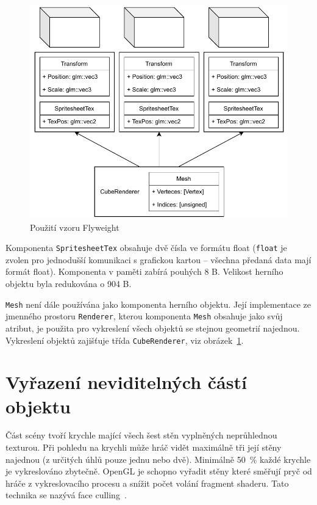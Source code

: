 \documentclass[thesis=M,czech]{FITthesis}[2019/12/23]
\begin{document}
\begin{figure}\centering
	\includegraphics[width=\textwidth]{images/go_components_fw_2}
	\caption[Použití vzoru Flyweight]{Použití vzoru Flyweight}\label{fig:go_components_fw}
\end{figure}

Komponenta \texttt{SpritesheetTex} obsahuje dvě čísla ve formátu float (\texttt{float} je zvolen pro jednodušší komunikaci s grafickou kartou -- všechna předaná data mají formát float). Komponenta v paměti zabírá pouhých 8 B. Velikost herního objektu byla redukována o 904 B.

\texttt{Mesh} není dále používána jako komponenta herního objektu. Její implementace ze jmenného prostoru \texttt{Renderer}, kterou komponenta \texttt{Mesh} obsahuje jako svůj atribut, je použita pro vykreslení všech objektů se stejnou geometrií najednou. Vykreslení objektů zajišťuje třída \texttt{CubeRenderer}, viz obrázek~\ref{fig:go_components_fw}.


\section{Vyřazení neviditelných částí objektu}

Část scény tvoří krychle mající všech šest stěn vyplněných neprůhlednou texturou. Při pohledu na krychli může hráč vidět maximálně tři její stěny najednou (z určitých úhlů pouze jednu nebo dvě). Minimálně 50~\% každé krychle je vykreslováno zbytečně. OpenGL je schopno vyřadit stěny které směřují pryč od hráče z vykreslovacího procesu a snížit počet volání fragment shaderu. Tato technika se nazývá face culling~\cite{lopgl_faceculling}.
\end{document}
